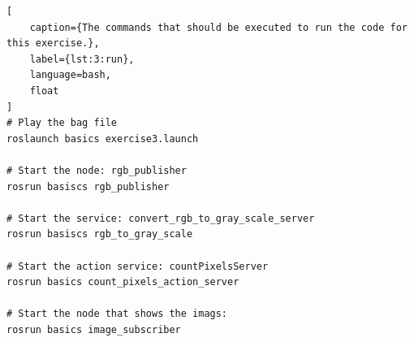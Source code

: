 \begin{lstlisting}[
	caption={The commands that should be executed to run the code for this exercise.},
	label={lst:3:run}, 
	language=bash,
	float
]
# Play the bag file
roslaunch basics exercise3.launch

# Start the node: rgb_publisher
rosrun basiscs rgb_publisher

# Start the service: convert_rgb_to_gray_scale_server
rosrun basiscs rgb_to_gray_scale

# Start the action service: countPixelsServer
rosrun basics count_pixels_action_server

# Start the node that shows the imags: 
rosrun basics image_subscriber
\end{lstlisting}